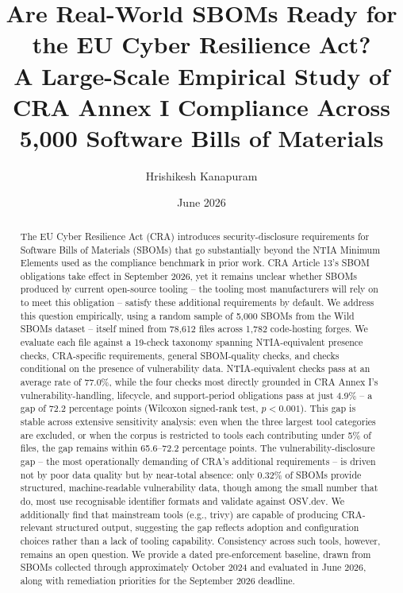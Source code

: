 \documentclass[11pt]{article}
\title{Are Real-World SBOMs Ready for the EU Cyber Resilience Act?\\
\large A Large-Scale Empirical Study of CRA Annex I Compliance Across 5,000 Software Bills of Materials}
\author[1]{Hrishikesh Kanapuram}
\affil[1]{Symbiosis Skills and Professional University\\\texttt{hrishik10@student.sspu.ac.in}}
\date{June 2026}
\begin{document}
\maketitle

\begin{abstract}
The EU Cyber Resilience Act (CRA) introduces security-disclosure requirements for Software Bills of Materials (SBOMs) that go substantially beyond the NTIA Minimum Elements used as the compliance benchmark in prior work. CRA Article 13's SBOM obligations take effect in September 2026, yet it remains unclear whether SBOMs produced by current open-source tooling -- the tooling most manufacturers will rely on to meet this obligation -- satisfy these additional requirements by default. We address this question empirically, using a random sample of 5,000 SBOMs from the Wild SBOMs dataset -- itself mined from 78,612 files across 1,782 code-hosting forges. We evaluate each file against a 19-check taxonomy spanning NTIA-equivalent presence checks, CRA-specific requirements, general SBOM-quality checks, and checks conditional on the presence of vulnerability data. NTIA-equivalent checks pass at an average rate of 77.0\%, while the four checks most directly grounded in CRA Annex I's vulnerability-handling, lifecycle, and support-period obligations pass at just 4.9\% -- a gap of 72.2 percentage points (Wilcoxon signed-rank test, $p<0.001$). This gap is stable across extensive sensitivity analysis: even when the three largest tool categories are excluded, or when the corpus is restricted to tools each contributing under 5\% of files, the gap remains within 65.6--72.2 percentage points. The vulnerability-disclosure gap -- the most operationally demanding of CRA's additional requirements -- is driven not by poor data quality but by near-total absence: only 0.32\% of SBOMs provide structured, machine-readable vulnerability data, though among the small number that do, most use recognisable identifier formats and validate against OSV.dev. We additionally find that mainstream tools (e.g., trivy) are capable of producing CRA-relevant structured output, suggesting the gap reflects adoption and configuration choices rather than a lack of tooling capability. Consistency across such tools, however, remains an open question. We provide a dated pre-enforcement baseline, drawn from SBOMs collected through approximately October 2024 and evaluated in June 2026, along with remediation priorities for the September 2026 deadline.
\end{abstract}
\end{document}
